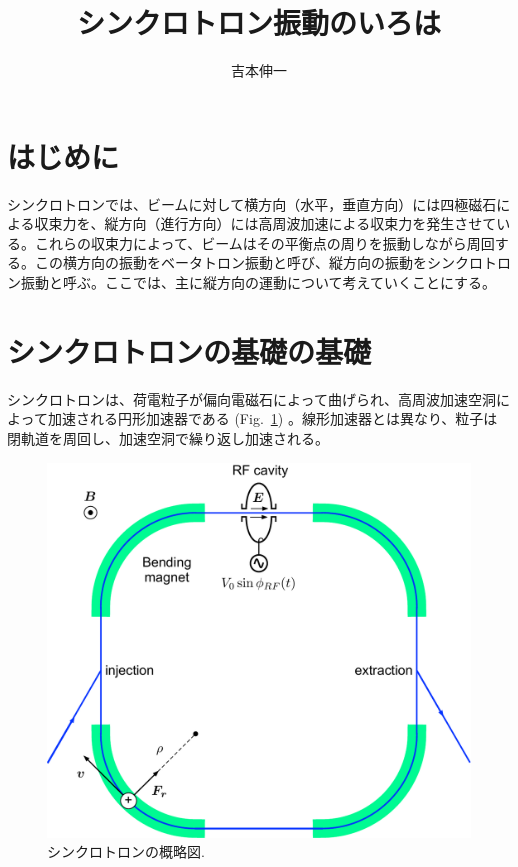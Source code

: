 \documentclass[10pt,a4paper]{jlreq}
\begin{document}
\title{シンクロトロン振動のいろは}
\author{吉本伸一}
\maketitle
\tableofcontents
\clearpage

\section{はじめに}
シンクロトロンでは、ビームに対して横方向（水平，垂直方向）には四極磁石による収束力を、縦方向（進行方向）には高周波加速による収束力を発生させている。これらの収束力によって、ビームはその平衡点の周りを振動しながら周回する。この横方向の振動をベータトロン振動と呼び、縦方向の振動をシンクロトロン振動と呼ぶ。ここでは、主に縦方向の運動について考えていくことにする。

\section{シンクロトロンの基礎の基礎}
シンクロトロンは、荷電粒子が偏向電磁石によって曲げられ、高周波加速空洞によって加速される円形加速器である (Fig.~\ref{synchrotron}) 。線形加速器とは異なり、粒子は閉軌道を周回し、加速空洞で繰り返し加速される。
%
\begin{figure}[hbt]
  \begin{center}
    \includegraphics[width=12cm,clip]{figs/synchrotron.pdf}
    \caption{シンクロトロンの概略図.}
   \label{synchrotron}
  \end{center}
\end{figure}
\end{document}
